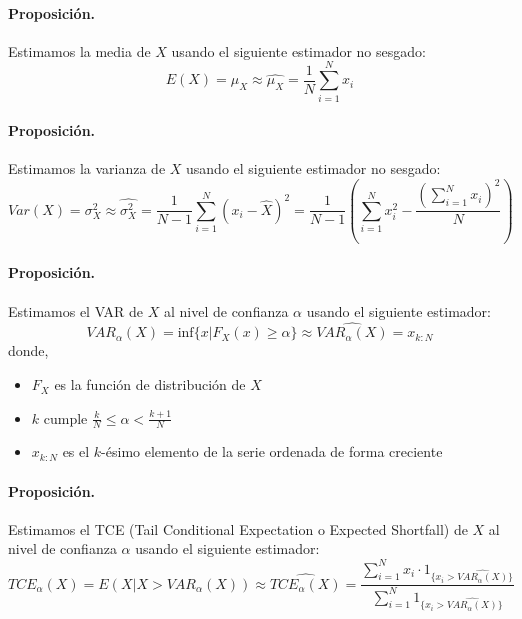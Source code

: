 \paragraph{Proposici\'on.} Estimamos la media de $X$ usando el siguiente
estimador no sesgado:
\begin{displaymath}
E(X) = \mu_X  \approx \widehat{\mu_X} = \frac{1}{N} \sum_{i=1}^{N} x_i
\end{displaymath}

\paragraph{Proposici\'on.} Estimamos la varianza de $X$ usando el siguiente
estimador no sesgado:
\begin{displaymath}
Var(X) = \sigma_{X}^{2} \approx \widehat{\sigma_{X}^{2}} =
\frac{1}{N-1} \sum_{i=1}^{N} (x_i - \widehat{X})^2 =
\frac{1}{N-1} \left( \sum_{i=1}^{N} x_i^2 - \frac{\left(\sum_{i=1}^{N} x_i \right)^2}{N} \right)
\end{displaymath}

\paragraph{Proposici\'on.} Estimamos el VAR de $X$ al nivel de confianza $\alpha$
usando el siguiente estimador:
\begin{displaymath}
VAR_{\alpha}(X) = \textrm{inf}\{x | F_X(x) \geq \alpha \} \approx \widehat{VAR_{\alpha}(X)} = x_{k:N}
\end{displaymath}
donde,
\begin{itemize}
\item $F_X$ es la funci\'on de distribuci\'on de $X$
\item $k$ cumple $\frac{k}{N} \leq \alpha < \frac{k+1}{N}$
\item $x_{k:N}$ es el $k$-\'esimo elemento de la serie ordenada de forma creciente
\end{itemize}

\paragraph{Proposici\'on.} Estimamos el TCE (Tail Conditional Expectation o Expected Shortfall)
de $X$ al nivel de confianza $\alpha$ usando el siguiente estimador:
\begin{displaymath}
TCE_{\alpha}(X) = E(X | X > VAR_{\alpha}(X)) \approx \widehat{TCE_{\alpha}(X)} =
\frac{\sum_{i=1}^{N} x_i \cdot \textrm{1}_{\{x_i >  \widehat{VAR_{\alpha}(X)}\}}}{\sum_{i=1}^{N} \textrm{1}_{\{x_i >  \widehat{VAR_{\alpha}(X)}\}}}
\end{displaymath}

